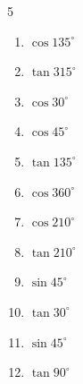 \begin{multicols}{5}
\begin{enumerate}
  \item $\displaystyle \cos{135^\circ}$


  \item $\displaystyle \tan{315^\circ}$

        \phantom{$\displaystyle =-1$}

\columnbreak %

\resetques

  \item $\displaystyle \cos{30^\circ}$


  \item $\displaystyle \cos{45^\circ}$


  \item $\displaystyle \tan{135^\circ}$

        \phantom{$\displaystyle =-1$}

  \item $\displaystyle \cos{360^\circ}$

        \phantom{$\displaystyle =1$}

  \item $\displaystyle \cos{210^\circ}$


  \item $\displaystyle \tan{210^\circ}$


  \item $\displaystyle \sin{45^\circ}$


  \item $\displaystyle \tan{30^\circ}$


  \item $\displaystyle \sin{45^\circ}$


  \item $\displaystyle \tan{90^\circ}$

        \phantom{$\displaystyle なし$}


\end{enumerate}
\end{multicols}
